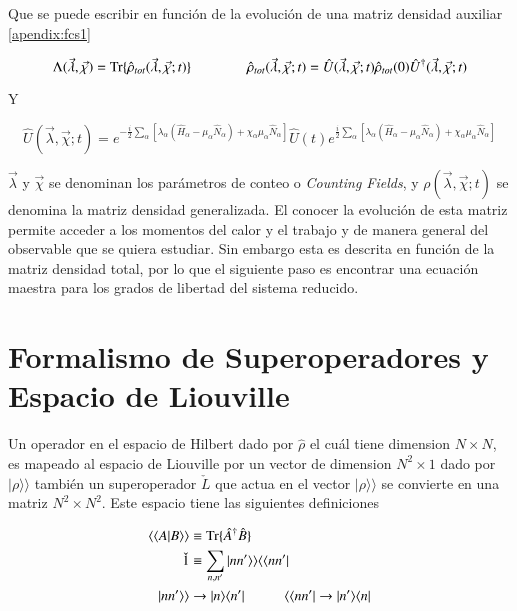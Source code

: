 Que se puede escribir en función de la evolución de una matriz densidad auxiliar \ref{apendix:fcs1}

\begin{equation}
    \Lambda(\vec{\lambda},\vec{\chi}) = \text{Tr}\{\hat{\rho}_{tot}(\vec{\lambda},\vec{\chi};t) \}    \hspace{14mm} \hat{\rho}_{tot}(\vec{\lambda},\vec{\chi};t) = \hat{U}(\vec{\lambda},\vec{\chi};t) \hat{\rho}_{tot}(0) \hat{U}^{\dagger}(\vec{\lambda},\vec{\chi};t)
    \label{sec2:evolucionconteo}
\end{equation}

Y 

\begin{equation*}
    \hat{U}(\vec{\lambda},\vec{\chi};t) = e^{-\frac{i}{2}\sum_{\alpha}[\lambda_{\alpha}(\hat{H}_{\alpha} - \mu_{\alpha}\hat{N}_{\alpha} ) + \chi_{\alpha}\mu_{\alpha}\hat{N}_{\alpha} ]  } \hat{U}(t) e^{\frac{i}{2}\sum_{\alpha}[ \lambda_{\alpha}(\hat{H}_{\alpha} - \mu_{\alpha}\hat{N}_{\alpha}) + \chi_{\alpha}\mu_{\alpha}\hat{N}_{\alpha} ]}
\end{equation*}

$\vec{\lambda}$ y $\vec{\chi}$ se denominan los parámetros de conteo o \textit{Counting Fields}, y $\rho(\vec{\lambda},\vec{\chi};t)$ se denomina la matriz densidad generalizada. El conocer la evolución de esta matriz permite acceder a los momentos del calor y el trabajo y de manera general del observable que se quiera estudiar. Sin embargo esta es descrita en función de la matriz densidad total, por lo que el siguiente paso es encontrar una ecuación maestra para los grados de libertad del sistema reducido.

\label{sec2:estadistica2puntos}



\section{Formalismo de Superoperadores y Espacio de Liouville}
Un operador en el espacio de Hilbert dado por $\hat{\rho}$ el cuál tiene dimension $N\times N$, es mapeado al espacio de Liouville por un vector de dimension $N^{2}\times 1$ dado por $|\rho \rangle \rangle$  también un superoperador $\check{L}$ que actua en el vector $|\rho\rangle \rangle$ se convierte en una matriz $N^{2}\times N^{2}$. Este espacio tiene las siguientes definiciones

\begin{align*}
    \langle \langle A|B\rangle \rangle  &\equiv \text{Tr}\{\hat{A}^{\dagger}\hat{B}\} \\
   \check{1}  &\equiv \sum_{n,n'}|nn'\rangle \rangle \langle \langle nn'| \\
     |nn'\rangle \rangle &  \to |n\rangle \langle n'|  \hspace{10mm}  \langle \langle nn'| \to |n'\rangle \langle n|     
\end{align*}

